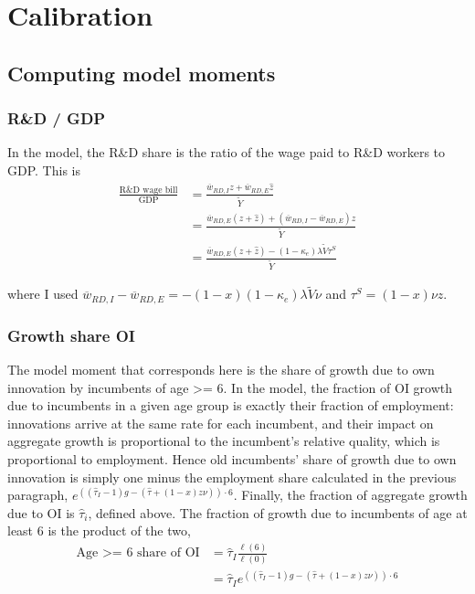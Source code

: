 \documentclass[11pt,english]{article}
\begin{document}
\section{Calibration}\label{appendix:calibration}

\subsection{Computing model moments}

\subsubsection{R\&D / GDP}\label{appendix:calibration:rd/gdp}

In the model, the R\&D share is the ratio of the wage paid to R\&D workers to GDP. This is
\begin{align*}
\frac{\textrm{R\&D wage bill}}{\textrm{GDP}} &= \frac{\overline{w}_{RD,I} z + \overline{w}_{RD,E} \hat{z}}{\tilde{Y}} \\ 
&= \frac{\overline{w}_{RD,E} (z + \hat{z}) + (\overline{w}_{RD,I} - \overline{w}_{RD,E})z}{\tilde{Y}} \\
&= \frac{\overline{w}_{RD,E} (z + \hat{z}) - (1-\kappa_e) \lambda \tilde{V} \tau^S}{\tilde{Y}}
\end{align*}

where I used $\overline{w}_{RD,I} - \overline{w}_{RD,E} = -(1-x)(1-\kappa_e) \lambda \tilde{V} \nu$ and $\tau^S = (1-x)\nu z$. 

\subsubsection{Growth share OI}\label{appendix:calibration:growthShareOI}

The model moment that corresponds here is the share of growth due to own innovation by incumbents of age >= 6. In the model, the fraction of OI growth due to incumbents in a given age group is exactly their fraction of employment: innovations arrive at the same rate for each incumbent, and their impact on aggregate growth is proportional to the incumbent's relative quality, which is proportional to employment. Hence old incumbents' share of growth due to own innovation is simply one minus the employment share calculated in the previous paragraph, $e^{((\hat{\tau}_I -1)g - (\hat{\tau} + (1-x)z \nu))\cdot 6}$. Finally, the fraction of aggregate growth due to OI is $\hat{\tau}_i$, defined above. The fraction of growth due to incumbents of age at least 6 is the product of the two, 
\begin{align*}
\textrm{Age >= 6 share of OI} &= \hat{\tau}_I \frac{\ell(6)}{\ell(0)} \\
&= \hat{\tau}_I e^{((\hat{\tau}_I -1)g - (\hat{\tau} + (1-x)z \nu))\cdot 6} 
\end{align*}
\end{document}
